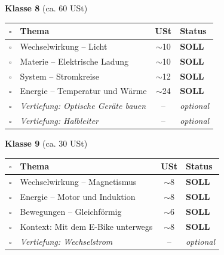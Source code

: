 \documentclass[11pt,a4paper]{article}
\newcommand{\checkbox}{$\square$}
\begin{document}
\vspace{0.4cm}

\begin{center}
\textbf{Klasse 8} (ca. 60 USt)
\end{center}

\begin{tabularx}{\textwidth}{c|l|c|X}
\rowcolor{lightblue}
\checkbox & \textbf{Thema} & \textbf{USt} & \textbf{Status} \\
\hline
\checkbox & Wechselwirkung -- Licht & $\sim$10 & \textbf{SOLL} \\
\rowcolor{lightgray}
\checkbox & Materie -- Elektrische Ladung & $\sim$10 & \textbf{SOLL} \\
\checkbox & System -- Stromkreise & $\sim$12 & \textbf{SOLL} \\
\rowcolor{lightgray}
\checkbox & Energie -- Temperatur und Wärme & $\sim$24 & \textbf{SOLL} \\
\checkbox & \textit{Vertiefung: Optische Geräte bauen} & -- & \textit{optional} \\
\rowcolor{lightgray}
\checkbox & \textit{Vertiefung: Halbleiter} & -- & \textit{optional} \\
\hline
\end{tabularx}

\vspace{0.4cm}

\begin{center}
\textbf{Klasse 9} (ca. 30 USt)
\end{center}

\begin{tabularx}{\textwidth}{c|l|c|X}
\rowcolor{lightblue}
\checkbox & \textbf{Thema} & \textbf{USt} & \textbf{Status} \\
\hline
\checkbox & Wechselwirkung -- Magnetismus & $\sim$8 & \textbf{SOLL} \\
\rowcolor{lightgray}
\checkbox & Energie -- Motor und Induktion & $\sim$8 & \textbf{SOLL} \\
\checkbox & Bewegungen -- Gleichförmig & $\sim$6 & \textbf{SOLL} \\
\rowcolor{lightgray}
\checkbox & Kontext: Mit dem E-Bike unterwegs & $\sim$8 & \textbf{SOLL} \\
\checkbox & \textit{Vertiefung: Wechselstrom} & -- & \textit{optional} \\
\hline
\end{tabularx}

\vspace{0.4cm}
\end{document}
